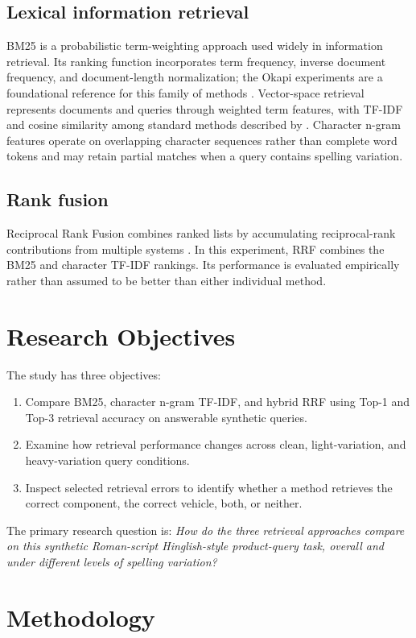 \documentclass[11pt,a4paper]{article}
\begin{document}
\subsection{Lexical information retrieval}
BM25 is a probabilistic term-weighting approach used widely in information retrieval. Its ranking function incorporates term frequency, inverse document frequency, and document-length normalization; the Okapi experiments are a foundational reference for this family of methods \citep{robertson1995okapi}. Vector-space retrieval represents documents and queries through weighted term features, with TF-IDF and cosine similarity among standard methods described by \citet{manning2008ir}. Character n-gram features operate on overlapping character sequences rather than complete word tokens and may retain partial matches when a query contains spelling variation.

\subsection{Rank fusion}
Reciprocal Rank Fusion combines ranked lists by accumulating reciprocal-rank contributions from multiple systems \citep{cormack2009rrf}. In this experiment, RRF combines the BM25 and character TF-IDF rankings. Its performance is evaluated empirically rather than assumed to be better than either individual method.

\section{Research Objectives}
The study has three objectives:
\begin{enumerate}
  \item Compare BM25, character n-gram TF-IDF, and hybrid RRF using Top-1 and Top-3 retrieval accuracy on answerable synthetic queries.
  \item Examine how retrieval performance changes across clean, light-variation, and heavy-variation query conditions.
  \item Inspect selected retrieval errors to identify whether a method retrieves the correct component, the correct vehicle, both, or neither.
\end{enumerate}
The primary research question is: \emph{How do the three retrieval approaches compare on this synthetic Roman-script Hinglish-style product-query task, overall and under different levels of spelling variation?}

\section{Methodology}
\end{document}
